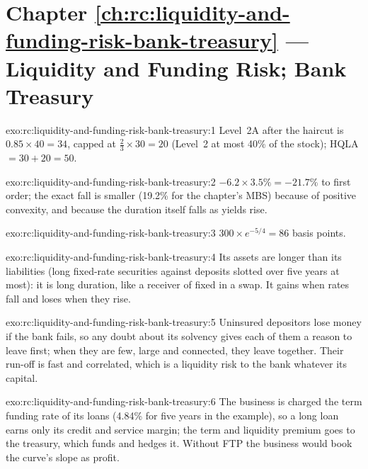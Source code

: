 \section*{Chapter \ref{ch:rc:liquidity-and-funding-risk-bank-treasury} --- Liquidity and Funding Risk; Bank Treasury}

\begin{solution}{exo:rc:liquidity-and-funding-risk-bank-treasury:1}
Level~2A after the haircut is $0.85\times40 = 34$, capped at $\tfrac23\times30 = 20$ (Level~2 at most 40\% of the
stock); HQLA $= 30+20 = 50$.
\end{solution}

\begin{solution}{exo:rc:liquidity-and-funding-risk-bank-treasury:2}
$-6.2\times3.5\% = -21.7\%$ to first order; the exact fall is smaller (19.2\% for the chapter's MBS) because
of positive convexity, and because the duration itself falls as yields rise.
\end{solution}

\begin{solution}{exo:rc:liquidity-and-funding-risk-bank-treasury:3}
$300\times e^{-5/4} = 86$ basis points.
\end{solution}

\begin{solution}{exo:rc:liquidity-and-funding-risk-bank-treasury:4}
Its assets are longer than its liabilities (long fixed-rate securities against deposits slotted over
five years at most): it is long duration, like a receiver of fixed in a swap. It gains when rates fall
and loses when they rise.
\end{solution}

\begin{solution}{exo:rc:liquidity-and-funding-risk-bank-treasury:5}
Uninsured depositors lose money if the bank fails, so any doubt about its solvency gives each of them a
reason to leave first; when they are few, large and connected, they leave together. Their run-off is
fast and correlated, which is a liquidity risk to the bank whatever its capital.
\end{solution}

\begin{solution}{exo:rc:liquidity-and-funding-risk-bank-treasury:6}
The business is charged the term funding rate of its loans (4.84\% for five years in the example), so a
long loan earns only its credit and service margin; the term and liquidity premium goes to the treasury,
which funds and hedges it. Without FTP the business would book the curve's slope as profit.
\end{solution}

